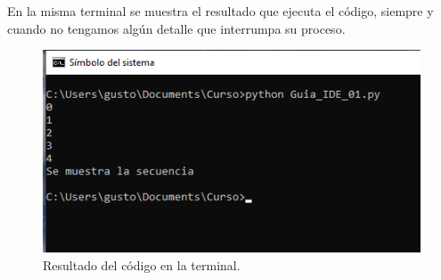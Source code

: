 En la misma terminal se muestra el resultado que ejecuta el código, siempre y cuando no tengamos algún detalle que interrumpa su proceso.
\begin{figure}[H]
    \centering
    \includegraphics{Imagenes/Guia_IDE_05.png}
    \caption{Resultado del código en la terminal.}
\end{figure}

